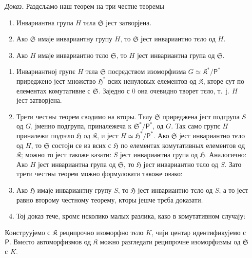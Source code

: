 \documentclass[11pt]{article}
\begin{document}
\emph{Доказ.} Раздєљамо наш теорем на три честне теоремы
\begin{enumerate}
\item Инвариантна група \(H\) тєла \(\mathfrak S\) јест затворјена.
\item Ако \(\mathfrak S\) имаје инвариантну групу \(H\), то \(\mathfrak S\) јест инвариантно тєло од \(H\).
\item Ако \(H\) имаје инвариантно тєло \(\mathfrak S\), то \(H\) јест инвариантна група од \(\mathfrak S\).
\end{enumerate}

\begin{enumerate}
\item Инвариантној групє \(H\) тєла \(\mathfrak S\) посрєдством изоморфизма \(G\simeq \mathfrak K^*/\mathsf P^*\) приреджено јест множство \(\mathfrak H^*\) всих ненуловых елементов од \(\mathfrak K\), кторе сут по елементах комутативне с \(\mathfrak S\). Заједно с 0 она очевидно творет тєло, т.~ј. \(H\) јест затворјена.

\item Трети честны теорем сводимо на вторы. Тєлу \(\mathfrak S\) приреджена јест подгрупа \(S\) од \(G\), јменно подгрупа, приналежеча к \(\mathfrak S^*/\mathsf P^*\), од \(G\). Так само групє \(H\) приналежи подтєло \(\mathfrak H\) од \(\mathfrak K\), и јест \(H\simeq \mathfrak H^*/\mathsf P^*\). Ако \(\mathfrak S\) јест инвариантно тєло од \(H\), то \(\mathfrak S\) состоји се из всих с \(\mathfrak H\) по елементах комутативных елементов од \(\mathfrak K\); можно то јест такоже казати: \(S\) јест инвариантна група од \(\mathfrak H\). Аналогично: Ако \(H\) јест инвариантна група од \(\mathfrak S\), то \(\mathfrak H\) јест инвариантно тєло од \(S\). Зато трети честны теорем можно формуловати такоже овако:

\item[\(3'\).] Ако \(\mathfrak H\) имаје инвариантну групу \(S\), то \(\mathfrak H\) јест инвариантно тєло од \(S\), а то јест равно второму честному теорему, кторы јешче трєба доказати.

\item[3.] Тој доказ тече, кромє нєколико малых разлика, како в комутативном случају:
\end{enumerate}

Конструујемо с \(\mathfrak K\) реципрочно изоморфно тєло \(K\), чији центар идентификујемо с \(\mathsf P\). Вмєсто автоморфизмов од \(\mathfrak K\) можно разгледати реципрочне изоморфизмы од \(\mathfrak S\) с \(K\).
\end{document}
